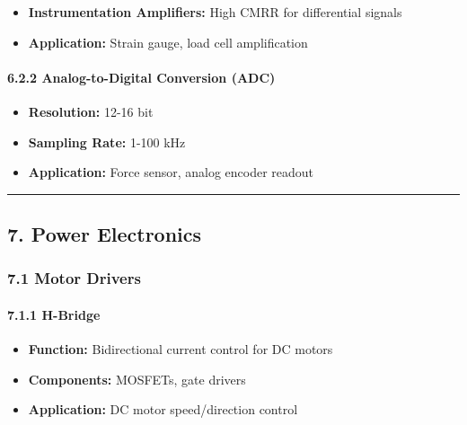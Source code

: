 \documentclass[
]{article}
\providecommand{\tightlist}{%
  \setlength{\itemsep}{0pt}\setlength{\parskip}{0pt}}
\begin{document}
\begin{itemize}
\tightlist
\item
  \textbf{Instrumentation Amplifiers:} High CMRR for differential
  signals
\item
  \textbf{Application:} Strain gauge, load cell amplification
\end{itemize}

\hypertarget{analog-to-digital-conversion-adc}{%
\paragraph{6.2.2 Analog-to-Digital Conversion
(ADC)}\label{analog-to-digital-conversion-adc}}

\begin{itemize}
\tightlist
\item
  \textbf{Resolution:} 12-16 bit
\item
  \textbf{Sampling Rate:} 1-100 kHz
\item
  \textbf{Application:} Force sensor, analog encoder readout
\end{itemize}

\begin{center}\rule{0.5\linewidth}{0.5pt}\end{center}

\hypertarget{power-electronics}{%
\subsection{7. Power Electronics}\label{power-electronics}}

\hypertarget{motor-drivers}{%
\subsubsection{7.1 Motor Drivers}\label{motor-drivers}}

\hypertarget{h-bridge}{%
\paragraph{7.1.1 H-Bridge}\label{h-bridge}}

\begin{itemize}
\tightlist
\item
  \textbf{Function:} Bidirectional current control for DC motors
\item
  \textbf{Components:} MOSFETs, gate drivers
\item
  \textbf{Application:} DC motor speed/direction control
\end{itemize}
\end{document}
